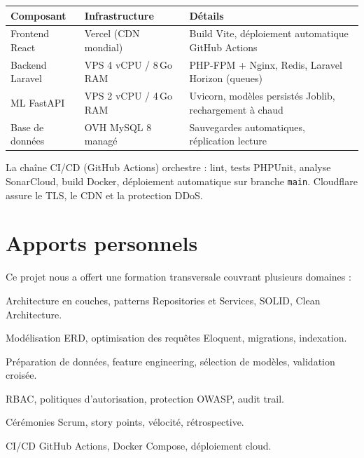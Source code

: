 \begin{table}[H]
  \centering
  \begin{tabularx}{\textwidth}{L{3cm}L{4cm}X}
    \toprule
    \textbf{Composant} & \textbf{Infrastructure} & \textbf{Détails} \\
    \midrule
    Frontend React  & Vercel (CDN mondial)    & Build Vite, déploiement automatique GitHub Actions \\
    Backend Laravel & VPS 4 vCPU / 8\,Go RAM & PHP-FPM + Nginx, Redis, Laravel Horizon (queues) \\
    ML FastAPI      & VPS 2 vCPU / 4\,Go RAM & Uvicorn, modèles persistés Joblib, rechargement à chaud \\
    Base de données & OVH MySQL 8 managé      & Sauvegardes automatiques, réplication lecture \\
    \bottomrule
  \end{tabularx}
\end{table}

La chaîne CI/CD (GitHub Actions) orchestre : lint, tests PHPUnit, analyse SonarCloud,
build Docker, déploiement automatique sur branche \texttt{main}. Cloudflare assure le
TLS, le CDN et la protection DDoS.

\section*{Apports personnels}

Ce projet nous a offert une formation transversale couvrant plusieurs domaines :

\begin{description}[leftmargin=3cm]
  \item[Génie logiciel] Architecture en couches, patterns Repositories et Services,
        SOLID, Clean Architecture.
  \item[Bases de données] Modélisation ERD, optimisation des requêtes Eloquent,
        migrations, indexation.
  \item[Intelligence artificielle] Préparation de données, feature engineering,
        sélection de modèles, validation croisée.
  \item[Sécurité] RBAC, politiques d'autorisation, protection OWASP, audit trail.
  \item[Méthodes agiles] Cérémonies Scrum, story points, vélocité, rétrospective.
  \item[DevOps] CI/CD GitHub Actions, Docker Compose, déploiement cloud.
\end{description}

